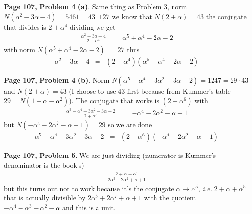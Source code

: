 \documentclass[aps,preprint,preprintnumbers,nofootinbib,showpacs,prd]{revtex4-1}
\newcommand{\ie}{{\it i.e.} }
\newcommand{\nbea}{\begin{eqnarray*}}
\newcommand{\neea}{\end{eqnarray*}}
\begin{document}
{\bf Page 107, Problem 4 (a)}. Same thing as Problem 3, norm $N(\alpha^2 - 3\alpha - 4) = 5461 = 43 \cdot 127$ we know that $N(2 + \alpha) = 43$ the conjugate that divides is $2 + \alpha^4$ dividing we get
%
\nbea
\frac{\alpha^2 - 3\alpha - 4}{2 + \alpha^4} & = & \alpha^5 + \alpha^4 - 2\alpha - 2
\neea
%
with norm $N(\alpha^5 + \alpha^4 - 2\alpha - 2) = 127$ thus
%
\nbea
\alpha^2 - 3\alpha - 4 & = & (2 + \alpha^4)(\alpha^5 + \alpha^4 - 2\alpha - 2)
\neea
%

{\bf Page 107, Problem 4 (b)}. Norm $N(\alpha^5 - \alpha^4 - 3\alpha^2 - 3\alpha - 2) = 1247 = 29 \cdot 43$ and $N(2 + \alpha) = 43$ (I choose to use 43 first because from Kummer's table $29 = N(1 + \alpha - \alpha^2)$). The conjugate that works is  $(2 + \alpha^6)$ with
%
\nbea
\frac{\alpha^5 - \alpha^4 - 3\alpha^2 - 3\alpha - 2}{2 + \alpha^6} & = & -\alpha^4 - 2\alpha^2 - \alpha - 1
\neea
%
but $N(-\alpha^4 - 2\alpha^2 - \alpha - 1) = 29$ so we are done
%
\nbea
\alpha^5 - \alpha^4 - 3\alpha^2 - 3\alpha - 2 & = & (2 + \alpha^6)(-\alpha^4 - 2\alpha^2 - \alpha - 1)
\neea
%

{\bf Page 107, Problem 5}. We are just dividing  (numerator is Kummer's denominator is the book's)
%
\nbea
\frac{2 + \alpha + \alpha^3}{2\alpha^5 + 2\alpha^2 + \alpha + 1}
\neea
%
but this turns out not to work because it's the conjugate $\alpha\to\alpha^5$, \ie $2 + \alpha + \alpha^5$ that is actually divisible by $2\alpha^5 + 2\alpha^2 + \alpha + 1$ with the quotient $-\alpha^4-\alpha^3-\alpha^2-\alpha$ and this is a unit.
\end{document}
